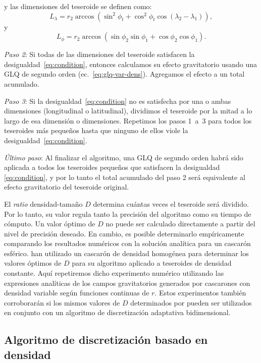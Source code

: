\noindent
y las dimensiones del teseroide se definen como:
%
\begin{equation}
    L_\lambda = r_2 \arccos(\sin^2\phi_t +
        \cos^2\phi_t\cos(\lambda_2 - \lambda_1)),
    \label{eq:sizelon}
\end{equation}
%
y
%
\begin{equation}
    L_\phi = r_2 \arccos(\sin\phi_2\sin\phi_1 + \cos\phi_2\cos\phi_1).
\end{equation}

\textit{Paso 2}:
Si todas de las dimensiones del teseroide satisfacen la
desigualdad~\ref{eq:condition}, entonces calculamos su efecto gravitatorio
usando una \ac{GLQ} de segundo orden (ec.~\ref{eq:glq-var-dens}).
Agregamos el efecto a un total acumulado.

\textit{Paso 3}:
Si la desigualdad~\ref{eq:condition} no es satisfecha por una o ambas
dimensiones (longitudinal o latitudinal), dividimos el teseroide por la mitad
a lo largo de esa dimensión o dimensiones.
Repetimos los pasos 1~a~3 para todos los teseroides más pequeños hasta que
ninguno de ellos viole la desigualdad~\ref{eq:condition}.

\textit{Último paso}:
Al finalizar el algoritmo, una \ac{GLQ} de segundo orden habrá sido aplicada
a todos los teseroides pequeños que satisfacen la desigualdad
\ref{eq:condition}, y por lo tanto el total acumulado del paso 2 será
equivalente al efecto gravitatorio del teseroide original.

El \emph{ratio} densidad-tamaño $D$ determina cuántas veces el teseroide será
dividido.
Por lo tanto, su valor regula tanto la precisión del algoritmo como su tiempo
de cómputo.
Un valor óptimo de $D$ no puede ser calculado directamente a partir del nivel
de precisión deseado.
En cambio, es posible determinarlo empíricamente comparando los resultados
numéricos con la solución analítica para un cascarón esférico.
\citet{uieda2016} han utilizado un cascarón de densidad homogénea para
determinar los valores óptimos de $D$ para su algoritmo aplicado a teseroides
de densidad constante.
Aquí repetiremos dicho experimento numérico utilizando las expresiones
analíticas de los campos gravitatorios generados por cascarones con densidad
variable según funciones continuas de $r$.
Estos experimentos también corroborarán si los mismos valores de $D$
determinados por \citet{uieda2016} pueden ser utilizados en conjunto con un
algoritmo de discretización adaptativa bidimensional.


\subsection{Algoritmo de discretización basado en densidad}

